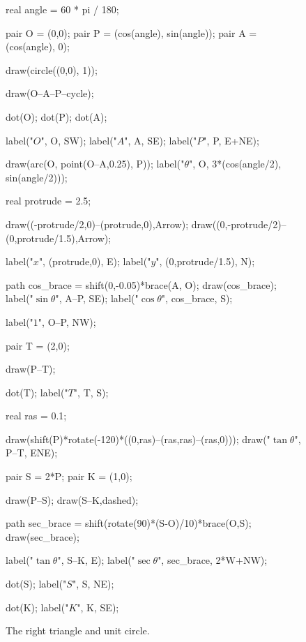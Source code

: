 \documentclass[../key.tex]{subfiles}
\begin{document}
\begin{figure}[h]
	\begin{center}
		\begin{minipage}{\textwidth}
			\centering
			\begin{asy}[width=0.6\textwidth]
				real angle = 60 * pi / 180;
				
				pair O = (0,0);
				pair P = (cos(angle), sin(angle));
				pair A = (cos(angle), 0);
				
				draw(circle((0,0), 1));
				
				draw(O--A--P--cycle);
				
				dot(O);
				dot(P);
				dot(A);
				
				label("$O$", O, SW);
				label("$A$", A, SE);
				label("$P$", P, E+NE);
				
				draw(arc(O, point(O--A,0.25), P));
				label("$\theta$", O, 3*(cos(angle/2), sin(angle/2)));
				
				real protrude = 2.5;
				
				draw((-protrude/2,0)--(protrude,0),Arrow);
				draw((0,-protrude/2)--(0,protrude/1.5),Arrow);
				
				label("$x$", (protrude,0), E);
				label("$y$", (0,protrude/1.5), N);
				
				path cos_brace = shift(0,-0.05)*brace(A, O);
				draw(cos_brace);
				label("$\sin\theta$", A--P, SE);
				label("$\cos\theta$", cos_brace, S);
				
				label("$1$", O--P, NW);
				
				pair T = (2,0);
				
				draw(P--T);
				
				dot(T);
				label("$T$", T, S);
				
				real ras = 0.1;
				
				draw(shift(P)*rotate(-120)*((0,ras)--(ras,ras)--(ras,0)));
				draw("$\tan\theta$", P--T, ENE);
				
				pair S = 2*P;
				pair K = (1,0);
				
				draw(P--S);
				draw(S--K,dashed);
				
				path sec_brace = shift(rotate(90)*(S-O)/10)*brace(O,S);
				draw(sec_brace);
				
				label("$\tan\theta$", S--K, E);
				label("$\sec\theta$", sec_brace, 2*W+NW);
				
				dot(S);
				label("$S$", S, NE);
				
				dot(K);
				label("$K$", K, SE);
				
			
			\end{asy}
		\end{minipage}
	\end{center}

	\begin{center}
		\begin{minipage}{\textwidth}
			\caption{The right triangle and unit circle.}
			\label{fig:right_tri_unit_circ}
		\end{minipage}
	\end{center}
	\vspace*{-2\baselineskip}
\end{figure}
\end{document}
